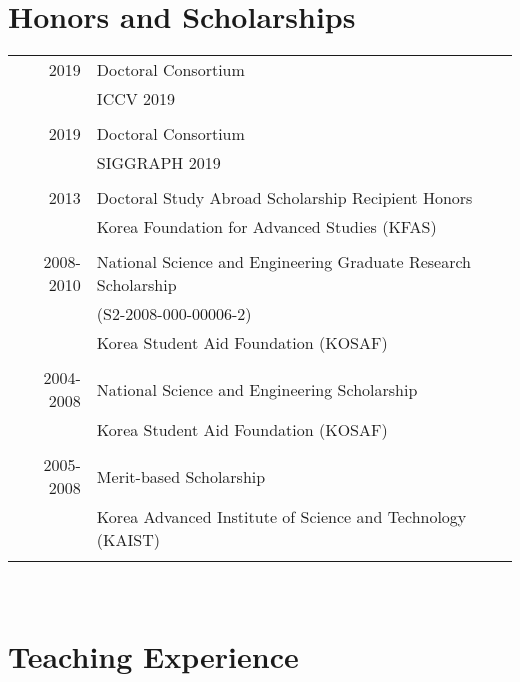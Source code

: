 \documentclass[letterpaper,10pt]{article} %
\newcommand{\blankline}{\quad\pagebreak[2]}
\begin{document}
{\begin{enumerate}
\end{enumerate}

\blankline



\section{Honors and Scholarships}

\begin{tabular}{rl}
2019 & Doctoral Consortium\\
& ICCV 2019\\
&\\
2019 & Doctoral Consortium\\
& SIGGRAPH 2019\\
&\\
2013 & Doctoral Study Abroad Scholarship Recipient Honors\\
& Korea Foundation for Advanced Studies (KFAS)\\
&\\
2008-2010 & National Science and Engineering Graduate Research Scholarship\\
& (S2-2008-000-00006-2)\\
& Korea Student Aid Foundation (KOSAF)\\
&\\
2004-2008 & National Science and Engineering Scholarship \\
& Korea Student Aid Foundation (KOSAF)\\
&\\
2005-2008 & Merit-based Scholarship\\
& Korea Advanced Institute of Science and Technology (KAIST)\\
&\\
\end{tabular}\\

\blankline



\section{Teaching Experience}

}
\end{document}
